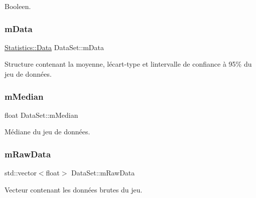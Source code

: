 Booleen. 

\mbox{\label{classDataSet_a043f1a249aa8752a8cc3115fbee61e2e}} 
\subsubsection{\texorpdfstring{m\+Data}{mData}}
{\footnotesize\ttfamily \hyperlink{structStatistics_1_1Data}{Statistics\+::\+Data} Data\+Set\+::m\+Data\hspace{0.3cm}{\ttfamily [private]}}



Structure contenant la moyenne, l\textquotesingle{}écart-\/type et l\textquotesingle{}intervalle de confiance à 95\% du jeu de données. 

\mbox{\label{classDataSet_acf52ca5fc1f11ea8f027c7b7ad1e0d34}} 
\subsubsection{\texorpdfstring{m\+Median}{mMedian}}
{\footnotesize\ttfamily float Data\+Set\+::m\+Median\hspace{0.3cm}{\ttfamily [private]}}



Médiane du jeu de données. 

\mbox{\label{classDataSet_a578c8ddd82c2e24468d88bfd4cbfc917}} 
\subsubsection{\texorpdfstring{m\+Raw\+Data}{mRawData}}
{\footnotesize\ttfamily std\+::vector$<$float$>$ Data\+Set\+::m\+Raw\+Data\hspace{0.3cm}{\ttfamily [private]}}



Vecteur contenant les données brutes du jeu. 

\mbox{\label{classDataSet_a0a2e6525fdc36753382e0546e26198df}} 
